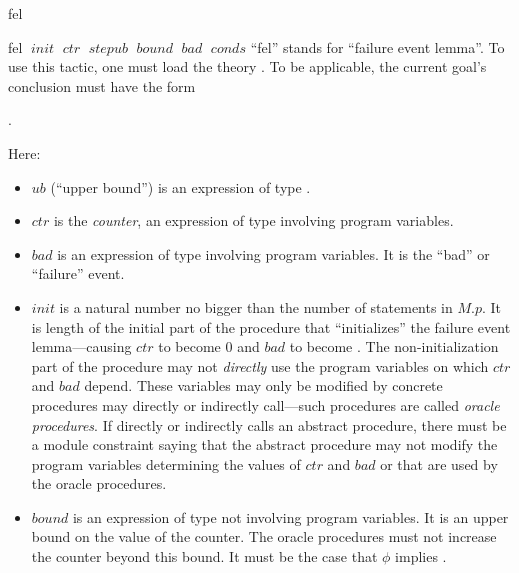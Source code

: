 \begin{tactic}{fel}
  \begin{tsyntax}{fel $\;\mathit{init}$ $\;\mathit{ctr}$ $\;\mathit{stepub}$
                      $\;\mathit{bound}$ $\;\mathit{bad}$ $\;\mathit{conds}$}
    ``fel'' stands for ``failure event lemma''. To use this tactic,
    one must load the theory . To be applicable, the
    current goal's conclusion must have the form
    \begin{center}
      .
    \end{center}
    Here:
    \begin{itemize}
    \item $\mathit{ub}$ (``upper bound'') is an expression of type .

    \item $\mathit{ctr}$ is the \emph{counter}, an expression of
      type  involving program variables.

    \item $\mathit{bad}$ is an expression of type  involving
      program variables. It is the ``bad'' or ``failure'' event.

    \item $\mathit{init}$ is a natural number no bigger than the
      number of statements in $M$.$p$. It is length of the initial
      part of the procedure that ``initializes'' the failure event
      lemma---causing $\mathit{ctr}$ to become $0$ and $\mathit{bad}$
      to become . The non-initialization part of the
      procedure may not \emph{directly} use the program variables on
      which $\mathit{ctr}$ and $\mathit{bad}$ depend. These variables
      may only be modified by concrete procedures  may
      directly or indirectly call---such procedures are called
      \emph{oracle procedures}.  If  directly or
      indirectly calls an abstract procedure, there must be a module
      constraint saying that the abstract procedure may not modify the
      program variables determining the values of $\mathit{ctr}$ and
      $\mathit{bad}$ or that are used by the oracle procedures.

    \item $\mathit{bound}$ is an expression of type  not
      involving program variables. It is an upper bound on the value
      of the counter. The oracle procedures must not increase the
      counter beyond this bound. It must be the case that $\phi$
      implies .


\end{itemize}
\end{tsyntax}
\end{tactic}
